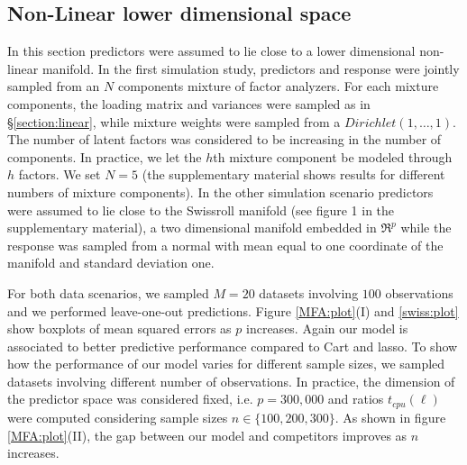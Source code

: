 \documentclass{article} %
\begin{document}
\subsection{Non-Linear lower dimensional space}

In this section predictors were assumed to lie close to a lower dimensional non-linear manifold. In the first simulation study, predictors and response were jointly sampled from an $N$ components mixture of factor analyzers. For each mixture components, the loading matrix and variances were sampled as in \S \ref{section:linear}, while mixture weights were sampled from a $Dirichlet(1, \dots, 1)$. The number of latent factors was considered to be increasing in the number of components. In practice, we let the $h$th mixture component be modeled through $h$ factors. We set $N=5$ (the supplementary material shows results for different numbers of mixture components). In the other simulation scenario predictors were assumed to lie close to the Swissroll manifold (see figure 1 in the supplementary material), a two dimensional manifold embedded in $\Re^p$ while the response was sampled from a normal with mean equal to one coordinate of the manifold and standard deviation one.

For both data scenarios, we sampled $M=20$ datasets involving $100$ observations and we performed leave-one-out predictions. Figure \ref{MFA:plot}(I) and  \ref{swiss:plot}  show boxplots of mean squared errors as $p$ increases.  Again our model is associated to better predictive performance compared to Cart and lasso. To show how the performance of our model varies for different sample sizes,  we sampled datasets involving different number of observations. In practice, the dimension of the predictor space was considered fixed, i.e. $p=300,000$ and ratios $t_{cpu}(\ell)$ were computed considering sample sizes $n \in \{100,200,300 \}$. As shown in figure \ref{MFA:plot}(II), the  gap between our model and competitors improves as $n$ increases. 


%
%
\end{document}
